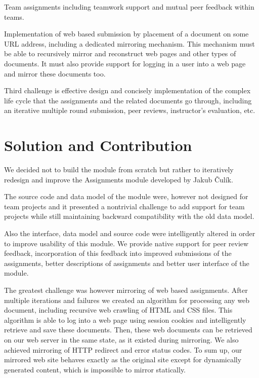 Team assignments including teamwork support and mutual peer feedback within teams. 

Implementation of web based submission by placement of a document on some URL address, including a dedicated mirroring mechanism. This mechanism must be able to recursively mirror and reconstruct web pages and other types of documents. It must also provide support for logging in a user into a web page and mirror these documents too. 

Third challenge is effective design and concisely implementation of the complex life cycle that the assignments and the related documents go through, including an iterative multiple round submission, peer reviews, instructor's evaluation, etc.


\section*{Solution and Contribution}
We decided not to build the module from scratch but rather to iteratively redesign and improve the Assignments module developed by Jakub \v{C}ul\'{i}k.

The source code and data model of the module were, however not designed for team projects and it presented a nontrivial challenge to add support for team projects while still maintaining backward compatibility with the old data model.

Also the interface, data model and source code were intelligently altered in order to improve usability of this module. We provide native support for peer review feedback, incorporation of this feedback into improved submissions of the assignments, better descriptions of assignments and better user interface of the module.

The greatest challenge was however mirroring of web based assignments. After multiple iterations and failures we created an algorithm for processing any web document, including recursive web crawling of HTML and CSS files. This algorithm is able to log into a web page using session cookies and intelligently retrieve and save these documents. Then, these web documents can be retrieved on our web server in the same state, as it existed during mirroring. We also achieved mirroring of HTTP redirect and error status codes. To sum up, our mirrored web site behaves exactly as the original site except for dynamically generated content, which is impossible to mirror statically.



